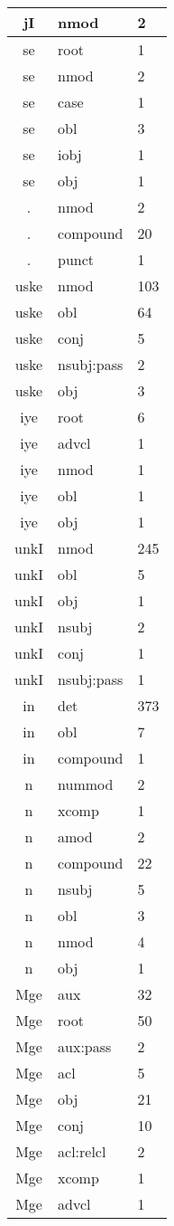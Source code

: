 \documentclass[a4 paper]{article}
\begin{document}
\begin{longtable}{cp{}p{}}
jI & nmod & 2\\ \midrule 
se & root & 1\\ \midrule se & nmod & 2\\ \midrule se & case & 1\\ \midrule se & obl & 3\\ \midrule se & iobj & 1\\ \midrule se & obj & 1\\ \midrule 
. & nmod & 2\\ \midrule . & compound & 20\\ \midrule . & punct & 1\\ \midrule 
uske & nmod & 103\\ \midrule uske & obl & 64\\ \midrule uske & conj & 5\\ \midrule uske & nsubj:pass & 2\\ \midrule uske & obj & 3\\ \midrule 
iye & root & 6\\ \midrule iye & advcl & 1\\ \midrule iye & nmod & 1\\ \midrule iye & obl & 1\\ \midrule iye & obj & 1\\ \midrule 
unkI & nmod & 245\\ \midrule unkI & obl & 5\\ \midrule unkI & obj & 1\\ \midrule unkI & nsubj & 2\\ \midrule unkI & conj & 1\\ \midrule unkI & nsubj:pass & 1\\ \midrule 
in & det & 373\\ \midrule in & obl & 7\\ \midrule in & compound & 1\\ \midrule 
n & nummod & 2\\ \midrule n & xcomp & 1\\ \midrule n & amod & 2\\ \midrule n & compound & 22\\ \midrule n & nsubj & 5\\ \midrule n & obl & 3\\ \midrule n & nmod & 4\\ \midrule n & obj & 1\\ \midrule 
Mge & aux & 32\\ \midrule Mge & root & 50\\ \midrule Mge & aux:pass & 2\\ \midrule Mge & acl & 5\\ \midrule Mge & obj & 21\\ \midrule Mge & conj & 10\\ \midrule Mge & acl:relcl & 2\\ \midrule Mge & xcomp & 1\\ \midrule Mge & advcl & 1\\ \midrule 

\end{longtable}
\end{document}
